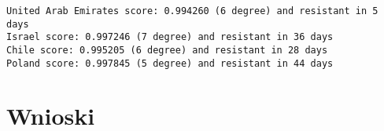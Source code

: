 \documentclass[12pt, oneside]{article}
\begin{document}
\begin{Verbatim}[tabsize=4]
United Arab Emirates score: 0.994260 (6 degree) and resistant in 5 days
Israel score: 0.997246 (7 degree) and resistant in 36 days
Chile score: 0.995205 (6 degree) and resistant in 28 days
Poland score: 0.997845 (5 degree) and resistant in 44 days
\end{Verbatim}


\section{Wnioski}
\end{document}
